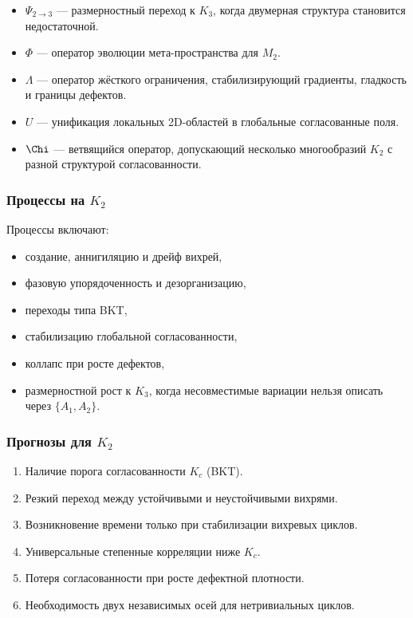 \begin{itemize}
    \item $\Psi_{2\to3}$ — размерностный переход к $K_3$, когда
          двумерная структура становится недостаточной.
    \item $\Phi$ — оператор эволюции мета-пространства для $M_2$.
    \item $\Lambda$ — оператор жёсткого ограничения, стабилизирующий
          градиенты, гладкость и границы дефектов.
    \item $U$ — унификация локальных 2D-областей в глобальные согласованные
          поля.
    \item $\Chi$ — ветвящийся оператор, допускающий несколько многообразий
          $K_2$ с разной структурой согласованности.
\end{itemize}

\subsubsection{Процессы на \texorpdfstring{$K_2$}{K_2}}

Процессы включают:
\begin{itemize}
    \item создание, аннигиляцию и дрейф вихрей,
    \item фазовую упорядоченность и дезорганизацию,
    \item переходы типа BKT,
    \item стабилизацию глобальной согласованности,
    \item коллапс при росте дефектов,
    \item размерностной рост к $K_3$, когда несовместимые вариации
          нельзя описать через $\{A_1, A_2\}$.
\end{itemize}

\subsubsection{Прогнозы для \texorpdfstring{$K_2$}{K_2}}

\begin{enumerate}
    \item Наличие порога согласованности $K_c$ (BKT).
    \item Резкий переход между устойчивыми и неустойчивыми вихрями.
    \item Возникновение времени только при стабилизации вихревых циклов.
    \item Универсальные степенные корреляции ниже $K_c$.
    \item Потеря согласованности при росте дефектной плотности.
    \item Необходимость двух независимых осей для нетривиальных циклов.
\end{enumerate}

